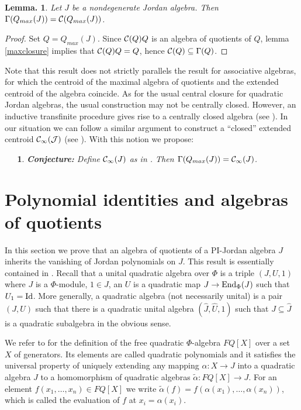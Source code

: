 \documentclass[a4paper,twoside,11pt]{article}
\theoremstyle{plain}
\theoremstyle{miestilo}
\newtheorem{lema}[subsection]{Lemma.}
\theoremstyle{misnotas}
\newtheorem{apartado}[subsection]{\ {\ }}
\begin{document}
\begin{lema}\label{centr}Let $J$ be a nondegenerate Jordan algebra. Then $\Gamma(Q_{max}(J)) =
\mathcal C(Q_{max}(J))$.\end{lema}

\begin{proof} Set $Q = Q_{max}(J)$. Since $\mathcal C(Q)Q$ is an algebra of quotients of $Q$,
lemma \ref{maxclosure}
implies that $\mathcal C(Q)Q = Q$, hence $\mathcal C(Q) \subseteq \Gamma(Q)$.\end{proof}

Note that this result does not strictly parallels the result for associative algebras, for which the centroid of the maximal algebra of quotients and the extended centroid of the algebra coincide. As for the usual central closure for quadratic Jordan algebras, the usual construction may not be centrally closed. However, an inductive transfinite procedure gives rise to a centrally closed algebra (see \cite[4]{mcz}). In our situation we can follow a similar argument to construct a ``closed'' extended centroid $\cal {C}_{\infty}(J)$ (see \cite{pi-ii}). With this notion we propose:

\begin{apartado}{\bf Conjecture:} Define $\mathcal C_\infty(J)$ as in \cite[ 4.11]{pi-ii}. Then
$\Gamma(Q_{max}(J)) = \mathcal C_\infty(J)$. \end{apartado}

\section{Polynomial identities and algebras of quotients}

In this section we prove that an algebra of quotients of a PI-Jordan algebra $J$ inherits the vanishing
of Jordan polynomials on $J$. This result is essentially contained in \cite{densos}. Recall \cite[3.1.5]{jac-struc} that
a unital quadratic algebra over $\Phi$ is a triple $(J,U,1)$ where $J$ is a $\Phi$-module, $1 \in J$, an $U$ is a quadratic map
$J\rightarrow {\rm End}_{\Phi}(J)$ such that $U_1=\rm Id$. More generally, a quadratic algebra (not necessarily unital) is a pair
$(J,U)$ such that there is a quadratic unital algebra $(\widehat{J}, \widehat{U},1)$ such that $J \subseteq \hat{J}$ is a quadratic subalgebra
in the obvious sense.

We refer to \cite{jac-struc} for the definition of the free quadratic $\Phi$-algebra $FQ[X]$ over a set $X$ of generators.
Its elements are called quadratic polynomials and it satisfies the universal property of uniquely extending any mapping
$\alpha: X \rightarrow J$ into a quadratic algebra $J$ to a homomorphism of quadratic algebras $\tilde{\alpha}: FQ[X]\rightarrow J$.
For an element $f(x_1, \dots, x_n)\in FQ[X]$ we write $\tilde{\alpha}(f)=f(\alpha(x_1),\dots,\alpha(x_n))$, which is called the
evaluation of $f$ at $x_i=\alpha(x_i)$.
\end{document}
